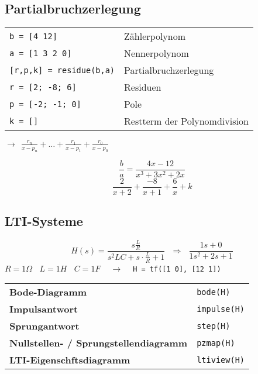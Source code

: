 \subsection{Partialbruchzerlegung}
\begin{minipage}{10cm}
  \begin{tabular}{ll}
    \verb?b = [4 12]? & Zählerpolynom \\
    \verb?a = [1 3 2 0]? & Nennerpolynom \\
    \verb?[r,p,k] = residue(b,a)? & Partialbruchzerlegung \\
    \verb?r = [2; -8; 6]? & Residuen \\
    \verb?p = [-2; -1; 0]? & Pole \\
    \verb?k = []? & Restterm der Polynomdivision
  \end{tabular} \newline
  $ \rightarrow ~~ \frac{r_n}{x - p_n} + \ldots + \frac{r_1}{x - p_1} +
  \frac{r_0}{x - p_0} $
\end{minipage}
\begin{minipage}{8cm}
  $$ \frac{b}{a} = \frac{4x -12}{x^3 + 3x^2 + 2x} $$
  \newline
  $$ \frac{2}{x+2} + \frac{-8}{x+1} + \frac{6}{x} + k$$
\end{minipage}


\subsection{LTI-Systeme}
$$ H(s) = \frac{s \frac{L}{R}}{s^2 LC + s\cdot\frac{L}{R} + 1} ~~~ \Rightarrow
~~~ \frac{1s + 0}{1s^2 + 2s + 1} $$ 
$ R = 1\Omega ~~~~ L = 1H ~~~~ C = 1F $
$~~~~\rightarrow~~~~$
\verb?H = tf([1 0], [12 1])?
 \newline

\begin{tabular}{ll}
    \textbf{Bode-Diagramm} &
    \verb?bode(H)?
  \\
    \textbf{Impulsantwort} &
    \verb?impulse(H)?
  \\
    \textbf{Sprungantwort} &
    \verb?step(H)?
  \\
    \textbf{Nullstellen- / Sprungstellendiagramm} &
    \verb?pzmap(H)?
  \\
    \textbf{LTI-Eigenschftsdiagramm} &
    \verb?ltiview(H)?
\end{tabular}
